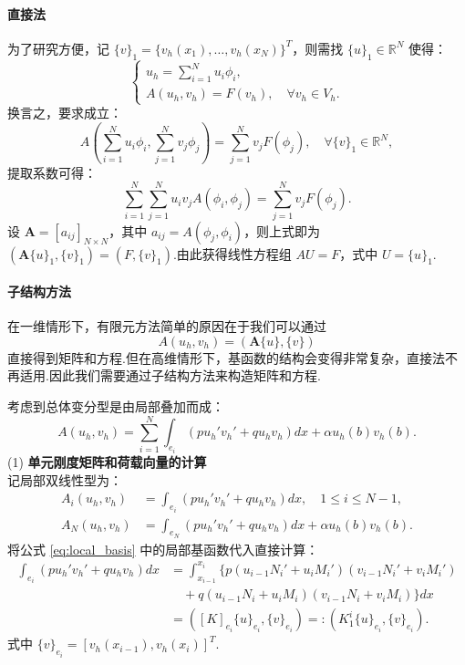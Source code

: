 \paragraph{直接法}
为了研究方便，记 $\{v\}_1 = \{v_h(x_1), \dots, v_h(x_N)\}^T$，则需找 $\{u\}_1 \in \mathbb{R}^N$ 使得：
\begin{equation*}
\begin{cases}
u_h = \sum_{i=1}^N u_i \phi_i, \\
A(u_h, v_h) = F(v_h), \quad \forall v_h \in V_h.
\end{cases}
\end{equation*}
换言之，要求成立：
\begin{equation*}
A\left(\sum_{i=1}^N u_i \phi_i, \sum_{j=1}^N v_j \phi_j\right) = \sum_{j=1}^N v_j F(\phi_j), \quad \forall \{v\}_1 \in \mathbb{R}^N,
\end{equation*}
提取系数可得：
\begin{equation*}
\sum_{i=1}^N \sum_{j=1}^N u_i v_j A(\phi_i, \phi_j) = \sum_{j=1}^N v_j F(\phi_j).
\end{equation*}
设 $\bm{A} = [a_{ij}]_{N \times N}$，其中 $a_{ij} = A(\phi_j, \phi_i)$，则上式即为 $(\bm{A}\{u\}_1, \{v\}_1) = (F, \{v\}_1)$.由此获得线性方程组 $AU = F$，式中 $U = \{u\}_1$.

\paragraph{子结构方法}
在一维情形下，有限元方法简单的原因在于我们可以通过
\begin{equation*}
    A(u_h, v_h) = (\bm{A}\{u\},\{v\})
\end{equation*}
直接得到矩阵和方程.但在高维情形下，基函数的结构会变得非常复杂，直接法不再适用.因此我们需要通过子结构方法来构造矩阵和方程.

考虑到总体变分型是由局部叠加而成：
\begin{equation}\label{eq:total_A}
A(u_h, v_h) = \sum_{i=1}^N \int_{e_i} (pu_h'v_h' + qu_h v_h)dx + \alpha u_h(b)v_h(b).
\end{equation}
(1) \textbf{单元刚度矩阵和荷载向量的计算} \\
记局部双线性型为：
\begin{align*}
A_i(u_h, v_h) &= \int_{e_i} (pu_h'v_h' + qu_h v_h)dx, \quad 1 \le i \le N-1, \\
A_N(u_h, v_h) &= \int_{e_N} (pu_h'v_h' + qu_h v_h)dx + \alpha u_h(b)v_h(b).
\end{align*}
将公式 \eqref{eq:local_basis} 中的局部基函数代入直接计算：
\begin{align*}
\int_{e_i} (pu_h'v_h' + qu_h v_h)dx &= \int_{x_{i-1}}^{x_i} \{ p(u_{i-1}N_i' + u_i M_i')(v_{i-1}N_i' + v_i M_i') \\
&\quad + q(u_{i-1}N_i + u_i M_i)(v_{i-1}N_i + v_i M_i) \} dx \\
&= ([K]_{e_i} \{u\}_{e_i}, \{v\}_{e_i}) =: (K_1^i \{u\}_{e_i}, \{v\}_{e_i}).
\end{align*}
式中 $\{v\}_{e_i} = [v_h(x_{i-1}), v_h(x_i)]^T$.

